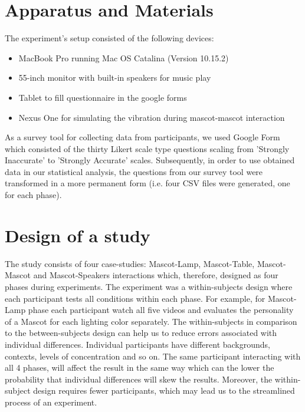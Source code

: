 \section{Apparatus and Materials}
The experiment’s setup consisted of the following devices:
\begin{itemize}
  \item MacBook Pro running Mac OS Catalina (Version 10.15.2)
  \item 55-inch monitor with built-in speakers for music play
  \item Tablet to fill questionnaire in the google forms
  \item Nexus One for simulating the vibration during mascot-mascot interaction
\end{itemize}

As a survey tool for collecting data from participants, we used Google Form which consisted of the thirty Likert scale type questions scaling from 'Strongly Inaccurate' to 'Strongly Accurate' scales. Subsequently, in order to use obtained data in our statistical analysis, the questions from our survey tool were transformed in a more permanent form (i.e. four CSV files were generated, one for each phase).

\section{Design of a study}
The study consists of four case-studies: Mascot-Lamp, Mascot-Table, Mascot-Mascot and Mascot-Speakers interactions which, therefore, designed as four phases during experiments. The experiment was a within-subjects design where each participant tests all conditions within each phase. For example, for Mascot-Lamp phase each participant watch all five videos and evaluates the personality of a Mascot for each lighting color separately. The within-subjects in comparison to the between-subjects design can help us to reduce errors associated with individual differences. Individual participants have different backgrounds, contexts, levels of concentration and so on. The same participant interacting with all 4 phases, will affect the result in the same way which can the lower the probability that individual differences will skew the results. Moreover, the within-subject design requires fewer participants, which may lead us to the streamlined process of an experiment. 

